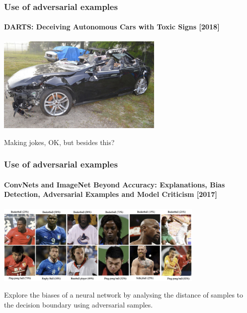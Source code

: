 \documentclass[9pt]{beamer}
\begin{document}
\begin{frame}
  \frametitle{Use of adversarial examples}

  \framesubtitle{DARTS: Deceiving Autonomous Cars with Toxic Signs [2018]}

  \begin{center}
    \includegraphics[width = 8cm]{images/car_crash.jpg}
  \end{center}

  \bigskip

  Making jokes, OK, but besides this?
\end{frame}

\begin{frame}

  \frametitle{Use of adversarial examples}

  \framesubtitle{ConvNets and ImageNet Beyond Accuracy: Explanations,
    Bias Detection, Adversarial Examples and Model Criticism [2017]}

  \begin{center}
    \includegraphics[width = 10cm]{images/imagenet_bias.png}
  \end{center}

  \bigskip
  Explore the biases of a neural network by analysing the distance
  of samples to the decision boundary using adversarial samples.
\end{frame}
\end{document}
